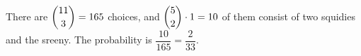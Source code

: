 There are $\dbinom{11}{3}=165$ choices, and $\dbinom52\cdot1=10$ of them consist of two squidies and the sreeny. The probability is $\dfrac{10}{165}=\boxed{\dfrac{2}{33}}$.
